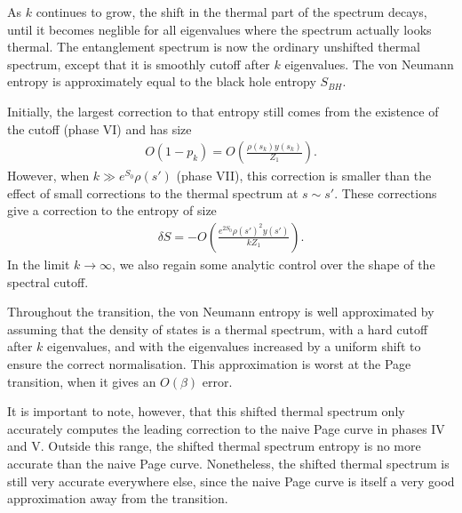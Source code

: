 \documentclass[11pt]{article}
\newcommand{\smax}{s_k}
\newcommand{\sprime}{s'}
\numberwithin{equation}{section}
\begin{document}
As $k$ continues to grow, the shift in the thermal part of the spectrum decays, until it becomes neglible for all eigenvalues where the spectrum actually looks thermal. The entanglement spectrum is now the ordinary unshifted thermal spectrum, except that it is smoothly cutoff after $k$ eigenvalues. The von Neumann entropy is approximately equal to the black hole entropy $S_{BH}$.

Initially, the largest correction to that entropy still comes from the existence of the cutoff (phase VI) and has size 
\begin{align}
O(1- p_k) = O\left(\frac{\rho(\smax) y(\smax)}{Z_1}\right). 
\end{align}
However, when $k \gg e^{S_0} \rho(\sprime)$ (phase VII), this correction is smaller than the effect of small corrections to the thermal spectrum at $s \sim \sprime$. These corrections give a correction to the entropy of size 
\begin{align}
\delta S = - O\left(\frac{e^{2S_0} \rho(\sprime)^2 y(\sprime)}{k Z_1}\right).
\end{align}
 In the limit $k \to \infty$, we also regain some analytic control over the shape of the spectral cutoff.

Throughout the transition, the von Neumann entropy is well approximated by assuming that the density of states is a thermal spectrum, with a hard cutoff after $k$ eigenvalues, and with the eigenvalues increased by a uniform shift to ensure the correct normalisation. This approximation is worst at the Page transition, when it gives an $O(\beta)$ error. 

It is important to note, however, that this shifted thermal spectrum only accurately computes the leading correction to the naive Page curve in phases IV and V. Outside this range, the shifted thermal spectrum entropy is no more accurate than the naive Page curve. Nonetheless,  the shifted thermal spectrum is still very accurate everywhere else, since the naive Page curve is itself a very good approximation away from the transition.
\end{document}
